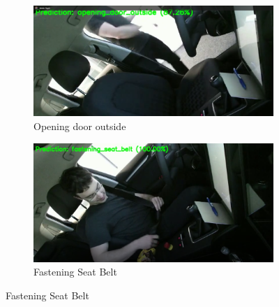 \documentclass{article}
\begin{document}
\begin{figure}[ht]
    \centering
    \begin{subfigure}{0.45\textwidth}
        \centering
        \includegraphics[width=\textwidth]{figs/DAR1.png}
        \caption{Opening door outside}
    \end{subfigure}
    \hspace{0.5cm}
    \begin{subfigure}{0.45\textwidth}
        \centering
        \includegraphics[width=\textwidth]{figs/DAR2.png}
        \caption{Fastening Seat Belt}
    \end{subfigure}

    \vspace{0.5cm}


\end{figure}
\end{document}
